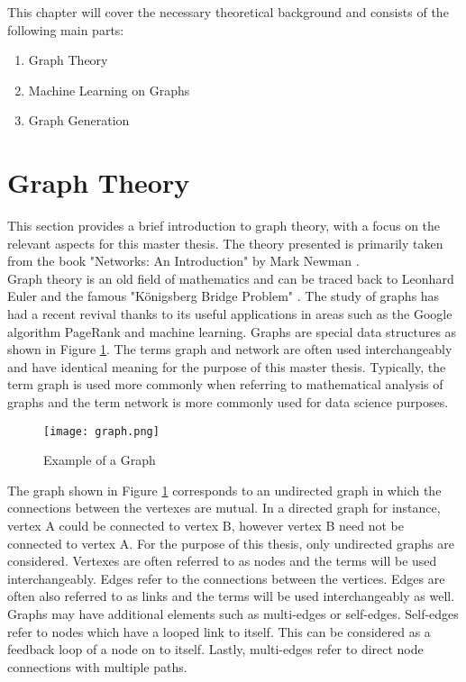 
	This chapter will cover the necessary theoretical background and consists 
	of the following main parts:

	\begin{enumerate}
		\item Graph Theory
		\item Machine Learning on Graphs
		\item Graph Generation
    \end{enumerate}

	\section{Graph Theory}

	This section provides a brief introduction to graph theory, with a focus on
	the relevant aspects for this master thesis. The theory presented is
	primarily taken from the book "Networks: An Introduction" by Mark Newman
	\citeyearpar{Newman2010}. \\

	\noindent Graph theory is an old field of mathematics and can be traced back 
	to Leonhard Euler and the famous "Königsberg Bridge Problem"
	\citep{euler1741solutio}. The study of graphs has had a recent revival
	thanks to its useful applications in areas such as the Google algorithm
	PageRank \cite{page1999pagerank} and machine learning. Graphs are special 
	data structures as shown in Figure \ref{fig:graph}. The terms graph and network 
	are often used interchangeably and have identical meaning for the purpose
	of this master thesis. Typically, the term graph is used more commonly when 
	referring to mathematical analysis of graphs and the term network is more 
	commonly used for data science purposes. \\

	\begin{figure}[h]
		\centering
		\texttt{[image: graph.png]}
		\caption{Example of a Graph}
		\cite[p. 111]{Newman2010}
		\label{fig:graph}
	\end{figure}
	
	\noindent The graph shown in Figure \ref{fig:graph} corresponds to an 
	undirected graph in which the connections between the vertexes are mutual. 
	In a directed graph for instance, vertex A could be connected to vertex B, 
	however vertex B need not be connected to vertex A. For the purpose of this 
	thesis, only undirected graphs are considered. Vertexes are often referred 
	to as nodes and the terms will be used interchangeably. Edges refer to the
	connections between the vertices. Edges are often also referred to as links
	and the terms will be used interchangeably as well. Graphs may have
	additional elements such as multi-edges or self-edges. Self-edges refer to
	nodes which have a looped link to itself. This can be considered as a feedback
	loop of a node on to itself. Lastly, multi-edges refer to direct node 
	connections with multiple paths. \\

